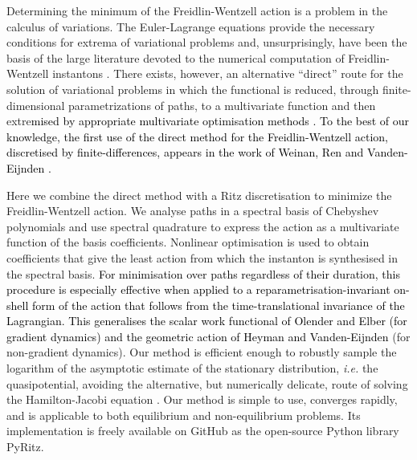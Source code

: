 Determining the minimum of the Freidlin-Wentzell action is a problem
in the calculus of variations. The Euler-Lagrange equations provide
the necessary conditions for extrema of variational problems and,
unsurprisingly, have been the basis of the large literature devoted
to the numerical computation of Freidlin-Wentzell instantons \citep{weinan2002string,paninski2006most,heymann2008geometric,grafke2017long}.
There exists, however, an alternative ``direct'' route for the solution
of variational problems in which the functional is reduced, through
finite-dimensional parametrizations of paths, to a multivariate function
and then extre\textcolor{black}{mised by appropriate multivariate
optimisation methods \citep{gelfand2012calculus,kantorovich1958approximate}.
To the best of our knowledge, the first use of the direct method for
the Freidlin-Wentzell action, discretised by finite-differences, appears
in the work of Weinan, Ren and Vanden-Eijnden \citep{weinan2004minimum}.} 

Here we combine the direct method with a Ritz discretisation \citep{ritz1909uber,gelfand2012calculus,kantorovich1958approximate}
to minimize the Freidlin-Wentzell action. We analyse paths in a spectral
basis of Chebyshev polynomials and use spectral quadrature to express
the action as a multivariate function of the basis coefficients. Nonlinear
optimisation is used to obtain coefficients that give the least action
from which the instanton is synthesised in the spectral basis.\textcolor{black}{{}
For minimisation over paths regardless of their duration, this procedure
is especially effective when applied to a reparametrisation-invariant
on-shell form of the action that follows from the time-translational
invariance of the Lagrangian. This generalises the scalar work functional
of Olender and Elber (for gradient dynamics) and the geometric action
of Heyman and Vanden-Eijnden} \citep{vanden2008geometric} (for non-gradient
dynamics). Our method is efficient enough to robustly sample the logarithm
of the asymptotic estimate of the stationary distribution, \emph{i.e.
}the quasipotential, avoiding the alternative, but numerically delicate,
route of solving the Hamilton-Jacobi equation \citep{cameron2012finding,yang2019computing,dahiya2018ordered}.
Our method is simple to use, converges rapidly, and is applicable
to both equilibrium and non-equilibrium problems. Its implementation
is freely available on GitHub as the open-source Python library PyRitz. 

